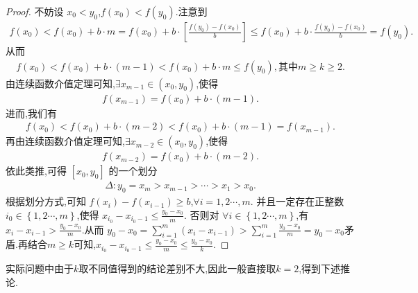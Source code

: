 \documentclass[lang=cn,newtx,10pt,scheme=chinese]{../Template/elegantbook}
\begin{document}
\begin{proof}
    不妨设 \(x_0<y_0\),\(f\left( x_0 \right) <f\left( y_0 \right)\).注意到 
    \begin{align*}
        f\left( x_0 \right) <f\left( x_0 \right) + b\cdot m = f\left( x_0 \right) + b\cdot \left[ \frac{f\left( y_0 \right) -f\left( x_0 \right)}{b} \right] \leq f\left( x_0 \right) + b\cdot \frac{f\left( y_0 \right) -f\left( x_0 \right)}{b}=f\left( y_0 \right).
    \end{align*}
从而 
\begin{align*}
    f\left( x_0 \right) <f\left( x_0 \right) + b\cdot \left( m - 1 \right) <f\left( x_0 \right) + b\cdot m\leq f\left( y_0 \right),\text{其中}m\geq k\geq 2.
\end{align*}
由连续函数介值定理可知,\(\exists x_{m - 1}\in \left( x_0,y_0 \right)\),使得 
\begin{align*}
    f\left( x_{m - 1} \right) = f\left( x_0 \right) + b\cdot \left( m - 1 \right).
\end{align*}
进而,我们有 
\begin{align*}
    f\left( x_0 \right) <f\left( x_0 \right) + b\cdot \left( m - 2 \right) <f\left( x_0 \right) + b\cdot \left( m - 1 \right) = f\left( x_{m - 1} \right).
\end{align*}
再由连续函数介值定理可知,\(\exists x_{m - 2}\in \left( x_0,y_0 \right)\),使得
\begin{align*}
   f\left( x_{m - 2} \right) = f\left( x_0 \right) + b\cdot \left( m - 2 \right).
\end{align*}
依此类推,可得 \(\left[ x_0,y_0 \right]\) 的一个划分 
\begin{align*}
    \Delta :y_0=x_m>x_{m - 1}>\cdots >x_1>x_0.
\end{align*}
根据划分方式,可知 \(f\left( x_i \right) - f\left( x_{i - 1} \right) \geq b\),\(\forall i = 1,2\cdots,m\).
并且一定存在正整数 \(i_0\in \left\{ 1,2\cdots,m \right\}\),使得 \(x_{i_0}-x_{i_0 - 1}\leq \frac{y_0 - x_0}{m}\).
否则对 \(\forall i\in \left\{ 1,2\cdots,m \right\}\),有 \(x_i - x_{i - 1}>\frac{y_0 - x_0}{m}\).从而 \(y_0 - x_0=\sum_{i = 1}^m{\left( x_i - x_{i - 1} \right)}>\sum_{i = 1}^m{\frac{y_0 - x_0}{m}} = y_0 - x_0\)矛盾.再结合$m\ge k$可知,\(x_{i_0}-x_{i_0 - 1}\leq \frac{y_0 - x_0}{m}\leq \frac{y_0 - x_0}{k}\).
\end{proof}
\begin{remark}
    实际问题中由于$k$取不同值得到的结论差别不大,因此一般直接取$k=2$,得到下述推论. 
\end{remark}
\end{document}
